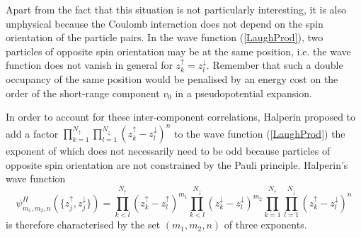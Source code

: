 \documentclass[10pt]{book}
\newcommand{\ua}{\uparrow}
\newcommand{\da}{\downarrow}
\newcommand{\beq}{\begin{equation}}
\newcommand{\eeq}{\end{equation}}
\begin{document}
Apart from the fact that this situation
is not particularly interesting, it is also unphysical because the Coulomb interaction does not depend on the spin orientation
of the particle pairs. In the wave function (\ref{LaughProd}), two particles of opposite spin orientation
may be at the same position, i.e. the wave function does not vanish in general for $z_k^{\ua}=z_l^{\da}$. Remember that such a 
double occupancy of the same position would be penalised by an energy cost on the order of the short-range component $v_0$
in a pseudopotential expansion. 

In order to account for these inter-component correlations, Halperin proposed to
add a factor $\prod_{k=1}^{N_{\ua}}\prod_{l=1}^{N_{\da}}(z_k^{\ua} - z_l^{\da})^n$ to the wave function (\ref{LaughProd})
the exponent of which does not necessarily need to be odd because particles of opposite spin orientation are not
constrained by the Pauli principle. Halperin's wave function
\beq\label{HalperinWF}
\psi_{m_1,m_2,n}^H (\{z_j^{\ua},z_j^{\da}\}) = \prod_{k<l}^{N_{\ua}}\left(z_k^{\ua} - z_l^{\ua}\right)^{m_1}
\prod_{k<l}^{N_{\da}}\left(z_k^{\da} - z_l^{\da}\right)^{m_2}\prod_{k=1}^{N_{\ua}}\prod_{l=1}^{N_{\da}}\left(z_k^{\ua} - z_l^{\da}\right)^n
\eeq
is therefore characterised by the set $(m_1,m_2,n)$ of three exponents.
\end{document}
